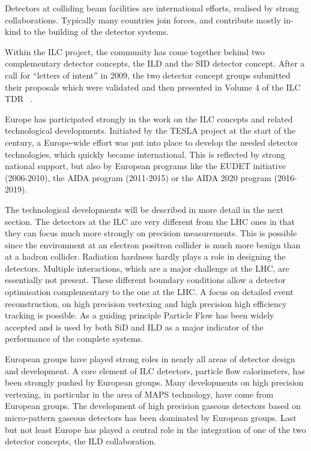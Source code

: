 \documentclass[%
 reprint,
 amsmath,amssymb,
 aps,
]{revtex4-1}
\begin{document}
Detectors at colliding beam facilities are international efforts, realised by strong collaborations. Typically many countries join forces, and contribute mostly in-kind to the building of the detector systems. 

Within the ILC project, the community has come together behind two complementary detector concepts, the ILD and the SID detector concept. After a call for ``letters of intent'' in 2009, the two detector concept groups submitted their proposals which were validated and then presented in Volume 4 of the ILC TDR ~\cite{ILC-TDR}.

Europe has participated strongly in the work on the ILC concepts and related technological developments. Initiated by the TESLA project at the start of the century, a Europe-wide effort was put into place to develop the needed detector technologies, which quickly became international. This is reflected by strong national support, but also by European programs like the EUDET initiative (2006-2010), the AIDA program (2011-2015) or the AIDA 2020 program (2016-2019).

The technological developments will be described in more detail in the next section. The detectors at the ILC are very different from the LHC ones in that they can focus much more strongly on precision measurements. This is possible since the environment at an electron positron collider is much more benign than at a hadron collider. Radiation hardness hardly plays a role in designing the detectors. Multiple interactions, which are a major challenge at the LHC, are essentially not present. These different boundary conditions allow a detector optimisation complementary to the one at the LHC. A focus on detailed event reconstruction, on high precision vertexing and high precision high efficiency tracking is possible. As a guiding principle Particle Flow has been widely accepted and is used by both SiD and ILD as a major indicator of the performance of the complete systems. 

European groups have played strong roles in nearly all areas of detector design and development. A core element of ILC detectors, particle flow calorimeters, has been strongly pushed by European groups. Many developments on high precision vertexing, in particular in the area of MAPS technology, have come from European groups. The development of high precision gaseous detectors based on micro-pattern gaseous detectors has been dominated by European groups. Last but not least Europe has played a central role in the integration of one of the two detector concepts, the ILD collaboration.  
\end{document}

